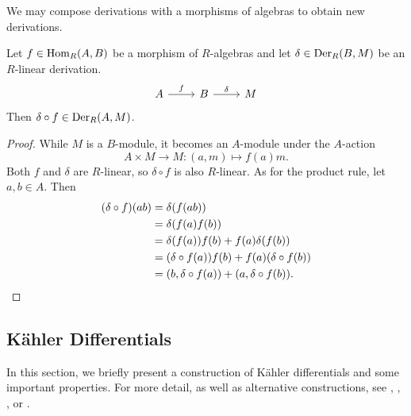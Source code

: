 We may compose derivations with a morphisms of algebras to obtain new derivations.

\begin{proposition}
  \label{prop_precompose_derivation}
  Let $f \in \operatorname{Hom}_R(A,B)$ be a morphism of $R$-algebras and let $\delta \in \operatorname{Der}_R(B,M)$ be an $R$-linear derivation.
  \[ \begin{tikzcd} A \arrow{r}{f} & B \arrow{r}{\delta} & M \end{tikzcd} \]
  Then $\delta \circ f \in \operatorname{Der}_R(A,M)$.
\end{proposition}
\begin{proof}
  While $M$ is a $B$-module, it becomes an $A$-module under the $A$-action
    \[ A \times M \to M : (a, m) \mapsto f(a)m. \]
  Both $f$ and $\delta$ are $R$-linear, so $\delta \circ f$ is also $R$-linear.
  As for the product rule, let $a, b \in A$. Then
  \begin{align*}
    (\delta \circ f)(ab)
      &= \delta(f(ab)) \\
      &= \delta(f(a)f(b)) \\
      &= \delta(f(a))f(b) + f(a)\delta(f(b)) \\
      &= (\delta \circ f(a))f(b) + f(a)(\delta \circ f(b)) \\
      &= (b, \delta \circ f(a)) + (a, \delta \circ f(b)). \qedhere
  \end{align*}
\end{proof}




\subsection{K\"ahler Differentials}
\label{sec_kahler_differentials}

In this section, we briefly present a construction of K\"ahler differentials and some important properties.
For more detail, as well as alternative constructions,
see \cite{eisenbud95}, \cite{eisenbud00}, \cite{goldschmidt03}, or \cite{stichtenoth09}.


